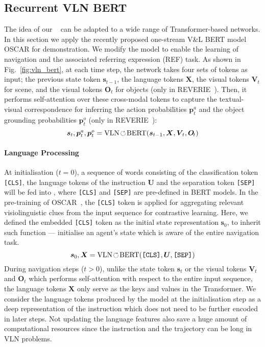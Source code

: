 \documentclass[final]{cvpr}
\def\CircleArrowright{\ensuremath{\rotatebox[origin=c]{310}{$\circlearrowright$}}}
\begin{document}
\subsection{Recurrent VLN BERT}
The idea of our \vlnbert~ can be adapted to a wide range of Transformer-based networks. In this section we apply the recently proposed one-stream V\&L BERT model OSCAR \cite{li2020oscar} for demonstration. We modify the model to enable the learning of navigation and the associated referring expression (REF) task. As shown in Fig.~\ref{fig:vln_bert}, at each time step, the network takes four sets of tokens as input; the previous state token $\boldsymbol{s}_{t-1}$, the language tokens $\boldsymbol{X}$, the visual tokens $\boldsymbol{V}_{\!t}$ for scene, and the visual tokens $\boldsymbol{O}_{\!t}$ for objects (only in REVERIE~\cite{qi2020reverie}). Then, it performs self-attention over these cross-modal tokens to capture the textual-visual correspondence for inferring the action probabilities $\boldsymbol{p}^{a}_{t}$ and the object grounding probabilities $\boldsymbol{p}^{o}_{t}$ (only in REVERIE~\cite{qi2020reverie}):
\begin{equation}
\boldsymbol{s}_{t},\boldsymbol{p}^{a}_{t}, \boldsymbol{p}^{o}_{t} = \text{VLN}\CircleArrowright\text{BERT}(\boldsymbol{s}_{t-1},\boldsymbol{X},\boldsymbol{V}_{\!t},\boldsymbol{O}_{\!t})
\label{eqn:vlnrbert}
\end{equation}

\vspace{-14pt}
\paragraph{Language Processing}
At initialisation ($t{=}0$), a sequence of words consisting of the classification token \texttt{[CLS]}, the language tokens of the instruction $\boldsymbol{U}$ and the separation token \texttt{[SEP]} will be fed into \vlnbert, where \texttt{[CLS]} and \texttt{[SEP]} are pre-defined in BERT models.
In the pre-training of OSCAR~\cite{li2020oscar}, the \texttt{[CLS]} token is applied for aggregating relevant visiolinguistic clues from the input sequence for contrastive learning. 
Here, we defined the embedded \texttt{[CLS]} token as the initial state representation $\boldsymbol{s}_{0}$, to inherit such function — initialise an agent’s state which is aware of the entire navigation task.
\begin{equation}
\boldsymbol{s}_{0},\boldsymbol{X}=\text{VLN}\CircleArrowright\text{BERT}(\texttt{[CLS]},\boldsymbol{U},\texttt{[SEP]})
\label{eqn:init}
\end{equation}
During navigation steps ($t{>}0$), unlike the state token $\boldsymbol{s}_{t}$ or the visual tokens $\boldsymbol{V}_{\!t}$ and $\boldsymbol{O}_{\!t}$ which performs self-attention with respect to the entire input sequence, the language tokens $\boldsymbol{X}$ only serve as the keys and values in the Transformer. We consider the language tokens produced by the model at the initialisation step as a deep representation of the instruction which does not need to be further encoded in later steps. Not updating the language features also save a huge amount of computational resources since the instruction and the trajectory can be long in VLN problems.
\end{document}

